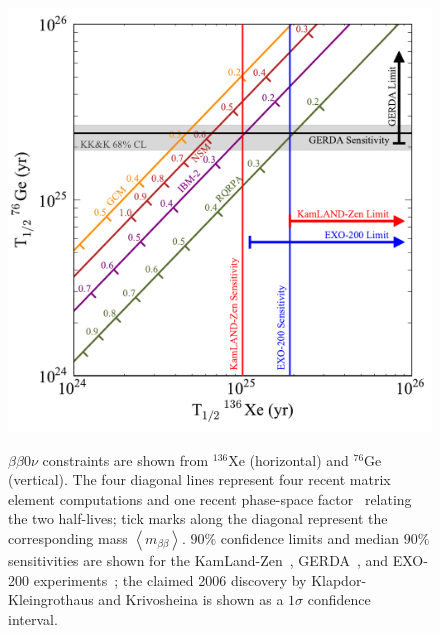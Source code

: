 \begin{figure}
\begin{center}
\includegraphics[keepaspectratio=true,width=\textwidth]{MatplotLibSensitivity.pdf}
\end{center}
\renewcommand{\baselinestretch}{1}
\small\normalsize
\begin{quote}
\caption{$\beta\beta 0\nu$ constraints are shown from $^{136}$Xe (horizontal) and $^{76}$Ge (vertical).  The four diagonal lines represent four recent matrix element computations \cite{PhysRevLett.105.252503,Menéndez2009139,PhysRevC.87.014315,PhysRevC.87.045501} and one recent phase-space factor~\cite{PhysRevC.85.034316} relating the two half-lives; tick marks along the diagonal represent the corresponding mass $\left<m_{\beta\beta}\right>$.  $90\%$ confidence limits and median $90\%$ sensitivities are shown for the KamLand-Zen~\cite{PhysRevLett.110.062502}, GERDA~\cite{PhysRevLett.111.122503}, and EXO-200 experiments~\cite{NewEXObb0nPaper_2014}; the claimed 2006 discovery by Klapdor-Kleingrothaus and Krivosheina is shown as a $1\sigma$ confidence interval.~\cite{Klapdor}}
\label{fig:MatplotlibSensitivity}
\end{quote}
\end{figure}
\renewcommand{\baselinestretch}{2}
\small\normalsize

